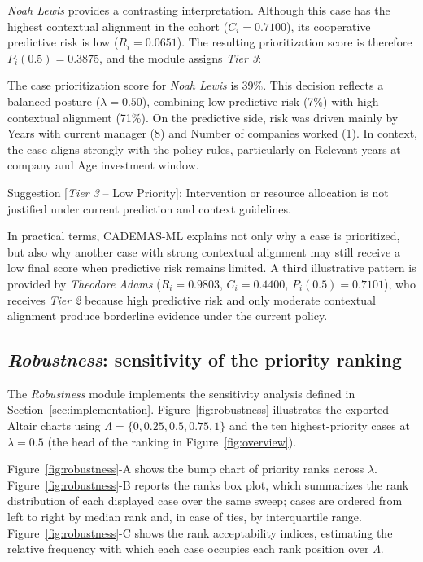 \documentclass{interact}
\renewenvironment{quote}{%
  \begin{mdframed}[style=quotebox]%
}{%
  \end{mdframed}%
}
\begin{document}
\textit{Noah Lewis} provides a contrasting interpretation. Although this case has the highest contextual alignment in the cohort ($C_i=0.7100$), its cooperative predictive risk is low ($R_i=0.0651$). The resulting prioritization score is therefore $P_i(0.5)=0.3875$, and the module assigns \textit{Tier 3}:

\begin{quote}
\small
The case prioritization score for \textit{Noah Lewis} is 39\%. This decision reflects a balanced posture ($\lambda=0.50$), combining low predictive risk (7\%) with high contextual alignment (71\%). On the predictive side, risk was driven mainly by Years with current manager (8) and Number of companies worked (1). In context, the case aligns strongly with the policy rules, particularly on Relevant years at company and Age investment window.

Suggestion [\textit{Tier 3} -- Low Priority]: Intervention or resource allocation is not justified under current prediction and context guidelines.
\end{quote}

In practical terms, CADEMAS-ML explains not only why a case is prioritized, but also why another case with strong contextual alignment may still receive a low final score when predictive risk remains limited. A third illustrative pattern is provided by \textit{Theodore Adams} ($R_i=0.9803$, $C_i=0.4400$, $P_i(0.5)=0.7101$), who receives \textit{Tier 2} because high predictive risk and only moderate contextual alignment produce borderline evidence under the current policy.

\subsection{\textit{Robustness}: sensitivity of the priority ranking}

The \textit{Robustness} module implements the sensitivity analysis defined in Section~\ref{sec:implementation}. Figure~\ref{fig:robustness} illustrates the exported Altair charts using $\Lambda=\{0,0.25,0.5,0.75,1\}$ and the ten highest-priority cases at $\lambda=0.5$ (the head of the ranking in Figure~\ref{fig:overview}).

Figure~\ref{fig:robustness}-A shows the bump chart of priority ranks across $\lambda$. Figure~\ref{fig:robustness}-B reports the ranks box plot, which summarizes the rank distribution of each displayed case over the same sweep; cases are ordered from left to right by median rank and, in case of ties, by interquartile range. Figure~\ref{fig:robustness}-C shows the rank acceptability indices, estimating the relative frequency with which each case occupies each rank position over $\Lambda$.
\end{document}
